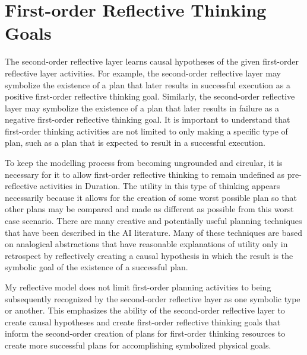 \section{First-order Reflective Thinking Goals}

The second-order reflective layer learns causal hypotheses of the
given first-order reflective layer activities.  For example, the
second-order reflective layer may symbolize the existence of a plan
that later results in successful execution as a positive first-order
reflective thinking goal.  Similarly, the second-order reflective
layer may symbolize the existence of a plan that later results in
failure as a negative first-order reflective thinking goal.  It is
important to understand that first-order thinking activities are not
limited to only making a specific type of plan, such as a plan that is
expected to result in a successful execution.

To keep the modelling process from becoming ungrounded and circular,
it is necessary for it to allow first-order reflective thinking to
remain undefined as pre-reflective activities in Duration.  The
utility in this type of thinking appears necessarily because it allows
for the creation of some worst possible plan so that other plans may
be compared and made as different as possible from this worst case
scenario.  There are many creative and potentially useful planning
techniques that have been described in the AI literature.  Many of
these techniques are based on analogical abstractions that have
reasonable explanations of utility only in retrospect by reflectively
creating a causal hypothesis in which the result is the symbolic goal
of the existence of a successful plan.

My reflective model does not limit first-order planning activities to
being subsequently recognized by the second-order reflective layer as
one symbolic type or another.  This emphasizes the ability of the
second-order reflective layer to create causal hypotheses and create
first-order reflective thinking goals that inform the second-order
creation of plans for first-order thinking resources to create more
successful plans for accomplishing symbolized physical goals.

